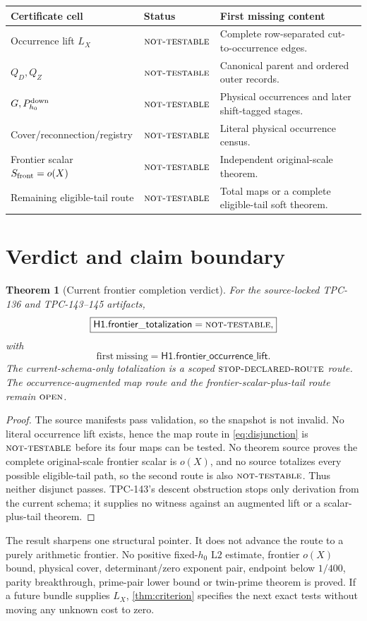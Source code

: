 \documentclass[11pt]{article}
\newtheorem{theorem}{Theorem}[section]
\theoremstyle{definition}
\theoremstyle{remark}
\newcommand{\NT}{\textnormal{\textsc{not-testable}}}
\newcommand{\STOP}{\textnormal{\textsc{stop-declared-route}}}
\newcommand{\OPEN}{\textnormal{\textsc{open}}}
\newcommand{\Ltwo}{\mathrm{L2}}
\begin{document}
\begin{center}
\footnotesize
\begin{tabularx}{\textwidth}{@{}P{0.34\textwidth}P{0.22\textwidth}Y@{}}
\toprule
Certificate cell & Status & First missing content\\
\midrule
Occurrence lift \(L_X\)
& \(\NT\) & Complete row-separated cut-to-occurrence edges.\\
\(Q_D,Q_Z\)
& \(\NT\) & Canonical parent and ordered outer records.\\
\(G,P_{h_0}^{\rm down}\)
& \(\NT\) & Physical occurrences and later shift-tagged stages.\\
Cover/reconnection/registry
& \(\NT\) & Literal physical occurrence census.\\
Frontier scalar \(S_{\rm front}=o(X)\)
& \(\NT\) & Independent original-scale theorem.\\
Remaining eligible-tail route
& \(\NT\) & Total maps or a complete eligible-tail soft theorem.\\
\bottomrule
\end{tabularx}
\end{center}

\section{Verdict and claim boundary}

\begin{theorem}[Current frontier completion verdict]
\label{thm:verdict}
For the source-locked TPC-136 and TPC-143--145 artifacts,
\[
 \boxed{
 \mathsf{H1.frontier\_totalization}=\NT,}
\]
with
\[
 \boxed{
 \mathrm{first\ missing}
 =
 \mathsf{H1.frontier\_occurrence\_lift}.}
\]
The current-schema-only totalization is a scoped \(\STOP\) route.
The occurrence-augmented map route and the frontier-scalar-plus-tail
route remain \(\OPEN\).
\end{theorem}

\begin{proof}
The source manifests pass validation, so the snapshot is not invalid.
No literal occurrence lift exists, hence the map route in
\eqref{eq:disjunction} is \(\NT\) before its four maps can be tested.
No theorem source proves the complete original-scale frontier scalar
is \(o(X)\), and no source totalizes every possible eligible-tail
path, so the second route is also \(\NT\).  Thus neither disjunct
passes.  TPC-143's descent obstruction stops only derivation from the
current schema; it supplies no witness against an augmented lift or
a scalar-plus-tail theorem.
\end{proof}

The result sharpens one structural pointer.  It does not advance the
route to a purely arithmetic frontier.  No positive fixed-\(h_0\)
\(\Ltwo\) estimate, frontier \(o(X)\) bound, physical cover,
determinant/zero exponent pair, endpoint below \(1/400\), parity
breakthrough, prime-pair lower bound or twin-prime theorem is proved.
If a future bundle supplies \(L_X\), \cref{thm:criterion} specifies
the next exact tests without moving any unknown cost to zero.

\begingroup
\scriptsize
\raggedright


\endgroup
\end{document}
